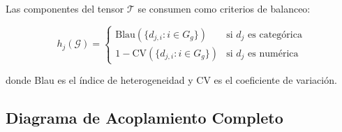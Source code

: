 \documentclass[12pt,a4paper]{article}
\begin{document}
Las componentes del tensor $\boldsymbol{\mathcal{T}}$ se consumen como criterios de balanceo:

\[
h_j(\mathcal{G}) = \begin{cases}
\text{Blau}(\{d_{j,i} : i \in G_g\}) & \text{si } d_j \text{ es categórica} \\
1 - \text{CV}(\{d_{j,i} : i \in G_g\}) & \text{si } d_j \text{ es numérica}
\end{cases}
\]

donde Blau es el índice de heterogeneidad y CV es el coeficiente de variación.

\subsection{Diagrama de Acoplamiento Completo}
\end{document}
